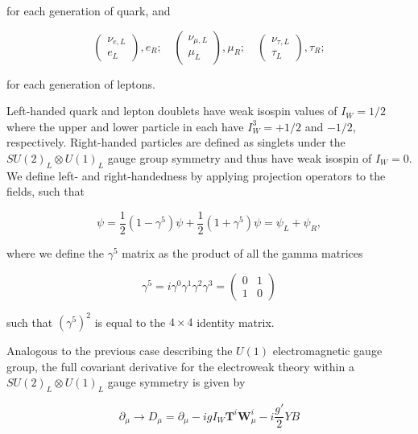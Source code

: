 for each generation of quark, and

\begin{equation}
\begin{pmatrix}
\nu_{e,L} \\
e_L
\end{pmatrix}
,e_R;
\quad
\begin{pmatrix}
\nu_{\mu,L} \\
\mu_L
\end{pmatrix}
,\mu_R;
\quad
\begin{pmatrix}
\nu_{\tau,L} \\
\tau_L
\end{pmatrix}
,\tau_R;
\end{equation}

for each generation of leptons. 

Left-handed quark and lepton doublets have weak isospin values of $I_W = 1/2$ where the upper and lower particle in each have $I^3_W = +1/2$ and $-1/2$, respectively. Right-handed particles are defined as singlets under the $SU(2)_L \otimes U(1)_L$ gauge group symmetry and thus have weak isospin of $I_W = 0$. We define left- and right-handedness by applying projection operators to the fields, such that

\begin{equation}
\psi = \frac{1}{2}(1-\gamma^5)\psi + \frac{1}{2}(1+\gamma^5)\psi = \psi_L + \psi_R,
\end{equation}

where we define the $\gamma^5$ matrix as the product of all the gamma matrices

\begin{equation}
\gamma^5 = i\gamma^0 \gamma^1 \gamma^2 \gamma^3 = 
\begin{pmatrix}
0 & 1 \\
1 & 0
\end{pmatrix}
\end{equation}

such that $\left(\gamma^5\right)^2$ is equal to the $4 \times 4$ identity matrix.


Analogous to the previous case describing the $U(1)$ electromagnetic gauge group, the full covariant derivative for the electroweak theory within a $SU(2)_L \otimes U(1)_L$ gauge symmetry is given by

\begin{equation}
\partial_{\mu} \to D_{\mu} = \partial_{\mu} - ig I_W \textbf{T}^i\textbf{W}^i_{\mu} - i\frac{g'}{2}YB
\end{equation}

